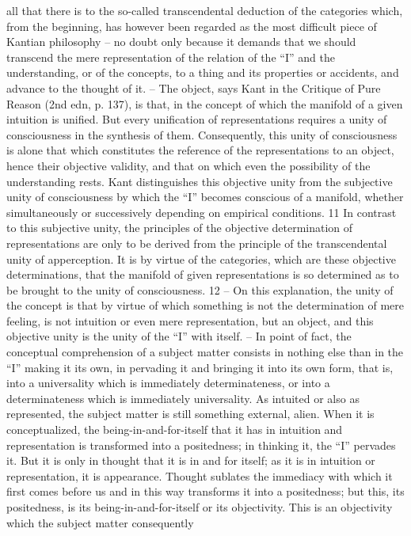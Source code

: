 all that there is to the so-called transcendental deduction of the categories
which, from the beginning, has however been regarded as the most difficult
piece of Kantian philosophy – no doubt only because it demands that we
should transcend the mere representation of the relation of the “I” and the
understanding, or of the concepts, to a thing and its properties or accidents,
and advance to the thought of it. – The object, says Kant in the Critique of
Pure Reason (2nd edn, p. 137), is that, in the concept of which the manifold
of a given intuition is unified. But every unification of representations
requires a unity of consciousness in the synthesis of them. Consequently, this
unity of consciousness is alone that which constitutes the reference of the
representations to an object, hence their objective validity, and that on
which even the possibility of the understanding rests. Kant distinguishes this
objective unity from the subjective unity of consciousness by which the
“I” becomes conscious of a manifold, whether simultaneously or successively
depending on empirical conditions. 11 In contrast to this subjective unity,
the principles of the objective determination of representations are only to
be derived from the principle of the transcendental unity of apperception. It
is by virtue of the categories, which are these objective determinations, that
the manifold of given representations is so determined as to be brought
to the unity of consciousness. 12 – On this explanation, the unity of the
concept is that by virtue of which something is not the determination of
mere feeling, is not intuition or even mere representation, but an object, and
this objective unity is the unity of the “I” with itself. – In point of fact,
the conceptual comprehension of a subject matter consists in nothing else
than in the “I” making it its own, in pervading it and bringing it into its
own form, that is, into a universality which is immediately determinateness,
or into a determinateness which is immediately universality. As intuited
or also as represented, the subject matter is still something external, alien.
When it is conceptualized, the being-in-and-for-itself that it has in intuition
and representation is transformed into a positedness; in thinking it, the “I”
pervades it. But it is only in thought that it is in and for itself; as it
is in intuition or representation, it is appearance. Thought sublates the
immediacy with which it first comes before us and in this way transforms
it into a positedness; but this, its positedness, is its being-in-and-for-itself or
its objectivity. This is an objectivity which the subject matter consequently
